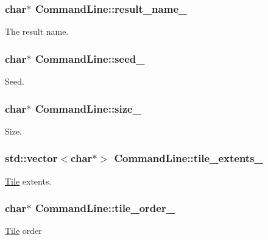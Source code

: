 \subsubsection[{result\+\_\+name\+\_\+}]{\setlength{\rightskip}{0pt plus 5cm}char$\ast$ Command\+Line\+::result\+\_\+name\+\_\+}\label{classCommandLine_a86248cf2fea828b7be7c3e4a174e3794}
The result name. \hypertarget{classCommandLine_a84c6395881d3fec0f25c260e8b2b2cb1}{}
\subsubsection[{seed\+\_\+}]{\setlength{\rightskip}{0pt plus 5cm}char$\ast$ Command\+Line\+::seed\+\_\+}\label{classCommandLine_a84c6395881d3fec0f25c260e8b2b2cb1}
Seed. \hypertarget{classCommandLine_a3f975e511512f21d28eeccd2ceb62ffd}{}
\subsubsection[{size\+\_\+}]{\setlength{\rightskip}{0pt plus 5cm}char$\ast$ Command\+Line\+::size\+\_\+}\label{classCommandLine_a3f975e511512f21d28eeccd2ceb62ffd}
Size. \hypertarget{classCommandLine_a2cd185d5e741976d04fd85f8ca22b1d1}{}
\subsubsection[{tile\+\_\+extents\+\_\+}]{\setlength{\rightskip}{0pt plus 5cm}std\+::vector$<$char$\ast$$>$ Command\+Line\+::tile\+\_\+extents\+\_\+}\label{classCommandLine_a2cd185d5e741976d04fd85f8ca22b1d1}
\hyperlink{classTile}{Tile} extents. \hypertarget{classCommandLine_a5d0c027e4b28133f763a1d1c9296b248}{}
\subsubsection[{tile\+\_\+order\+\_\+}]{\setlength{\rightskip}{0pt plus 5cm}char$\ast$ Command\+Line\+::tile\+\_\+order\+\_\+}\label{classCommandLine_a5d0c027e4b28133f763a1d1c9296b248}
\hyperlink{classTile}{Tile} order \hypertarget{classCommandLine_a175f51137314bb9d0097e25130fed261}{}
